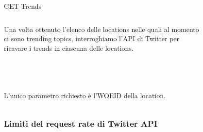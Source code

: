 \documentclass[xcolor=svgnames, aspectratio=169]{beamer}
\begin{document}
\begin{frame}{GET Trends}
    \fontsize{10pt}{10}\selectfont
    \begin{columns}[t]
        Una volta ottenuto l'elenco delle locations nelle quali al momento ci sono trending topics, interroghiamo l'API di Twitter per ricavare i trends in ciascuna delle locations.\\~\\~\\~\\~\\
        
        L'unico parametro richiesto è l'WOEID della location.
        
        \vspace*{-48pt}
        \begin{figure}[H]
            \centering
            \noindent{}
        \end{figure}
    \end{columns}
\end{frame}


\subsubsection{Limiti del request rate di Twitter API }
\end{document}

